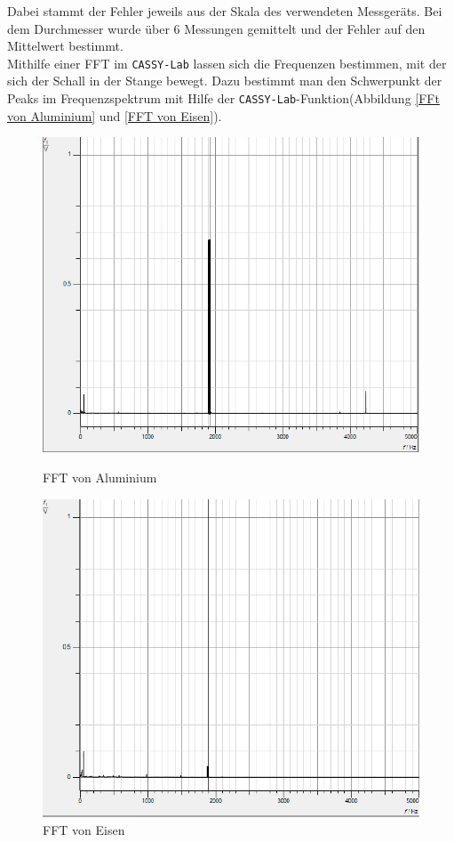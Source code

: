 \documentclass[a4paper, 11pt]{article}
\begin{document}
\noindent Dabei stammt der Fehler jeweils aus der Skala des verwendeten Messgeräts. Bei dem Durchmesser wurde über 6 Messungen gemittelt und der Fehler auf den Mittelwert bestimmt.
\\ Mithilfe einer FFT im \texttt{CASSY-Lab} lassen sich die Frequenzen bestimmen, mit der sich der Schall in der Stange bewegt. Dazu bestimmt man den Schwerpunkt der Peaks im Frequenzspektrum mit Hilfe der \texttt{CASSY-Lab}-Funktion(Abbildung \ref{FFt von Aluminium} und \ref{FFT von Eisen}). 
\begin{figure}[H]
	\begin{minipage}[t]{0.45\linewidth}
	\includegraphics[scale=0.3]{../Aluminium.png}
	\caption{FFT von Aluminium}
	\label{FFt von Aluminium}
	\end{minipage}
	\hspace{0.1\linewidth}
	\begin{minipage}[t]{0.45\linewidth}
	\includegraphics[scale=0.3]{../Eisen.png}
	\caption{FFT von Eisen}
	\label{FFT von Eisen}
	\end{minipage}
	\label{fig:Aufbau des Versuchs}
\end{figure}
\end{document}

